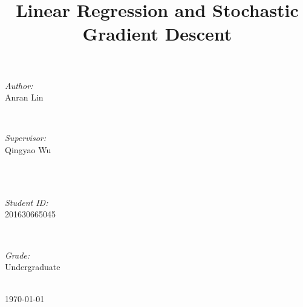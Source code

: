\documentclass[journal, a4paper]{IEEEtran}
\begin{document}
\begin{titlepage}
\begin{minipage}{0.4\textwidth}
\begin{flushleft} \large
\emph{Author:}\\
Anran Lin %
\end{flushleft}
\end{minipage}
~
\begin{minipage}{0.4\textwidth}
\begin{flushright} \large
\emph{Supervisor:} \\
Qingyao Wu %
\end{flushright}
\end{minipage}\\[2cm]
~
\begin{minipage}{0.4\textwidth}
\begin{flushleft} \large
\emph{Student ID:}\\
201630665045
\end{flushleft}
\end{minipage}
~
\begin{minipage}{0.4\textwidth}
\begin{flushright} \large
\emph{Grade:} \\
Undergraduate
\end{flushright}
\end{minipage}\\[2cm]



{\large \today}\\[2cm] %

 

\vfill %

\end{titlepage}

	\title{Linear Regression and Stochastic Gradient Descent}
	\maketitle
\end{document}
